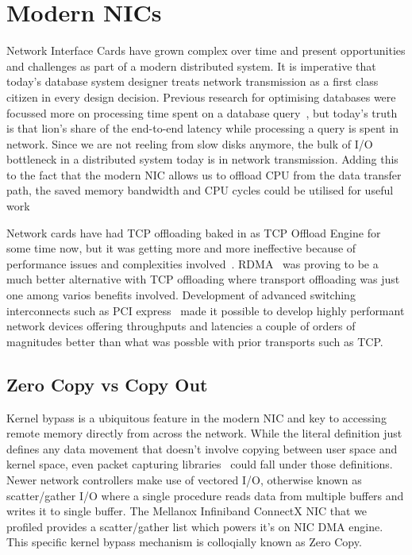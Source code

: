 
\chapter{Modern NICs}
Network Interface Cards have grown complex over time and present opportunities and 
challenges as part of a modern distributed system. It is imperative that today's
database system designer treats network transmission as a first class citizen in every design decision.
Previous research for optimising databases were focussed more on processing time spent on a 
database query~\cite{dbmsproctime}, but today's truth is that lion's share of the end-to-end latency
while processing a query is spent in network.
Since we are not reeling from slow disks anymore, the bulk of I/O bottleneck in a distributed system today is in network transmission.
Adding this to the fact that the modern NIC allows us to offload CPU from the data transfer path,
the saved memory bandwidth and CPU cycles could be utilised for useful work 

Network cards have had TCP offloading baked in as TCP Offload Engine for some time now, but it was getting 
more and more ineffective because of performance issues and complexities involved~\cite{tcpoffload}.
RDMA~\cite{rdmapatent,rdmacase,rdma} was proving to be a much better alternative with TCP offloading where
transport offloading was just one among varios benefits involved. Development of advanced switching 
interconnects such as PCI express~\cite{pcie} made it possible to develop highly performant 
network devices offering throughputs and latencies a couple of orders of magnitudes better
than what was possble with prior transports such as TCP.


\section{Zero Copy vs Copy Out}
Kernel bypass is a ubiquitous feature in the modern NIC and key to accessing remote memory directly 
from across the network. While the literal definition just defines any data movement that doesn't 
involve copying between user space and kernel space, even packet capturing libraries~\cite{pcap} could fall
under those definitions. Newer network controllers make use of vectored I/O, otherwise known as scatter/gather I/O
where a single procedure reads data from multiple buffers and writes it to single buffer. The Mellanox Infiniband ConnectX
NIC that we profiled provides a scatter/gather list which powers it's on NIC DMA engine. This specific kernel bypass
mechanism is colloqially known as Zero Copy.


